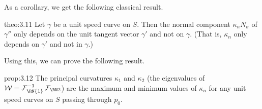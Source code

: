 As a corollary, we get the following classical result. 

\begin{theo}[Meusnier]{theo:3.11}
    Let $\gamma$ be a unit speed curve on $S$. Then the normal component 
    $\kappa_n N_\sigma$ of $\gamma''$ only depends on the unit tangent 
    vector $\gamma'$ and not on $\gamma$. (That is, $\kappa_n$ 
    only depends on $\gamma'$ and not in $\gamma$.)
\end{theo}\vspace{-0.25cm}

Using this, we can prove the following result. 

\begin{prop}{prop:3.12}
    The principal curvatures $\kappa_1$ and $\kappa_2$ (the eigenvalues of 
    ${\cal W} = {\cal F}_{\text{\RN{1}}}^{-1} \SFF$)
    are the maximum and minimum values of $\kappa_n$ for any unit speed curves 
    on $S$ passing through $p_0$. 
\end{prop}\vspace{-0.25cm} 
